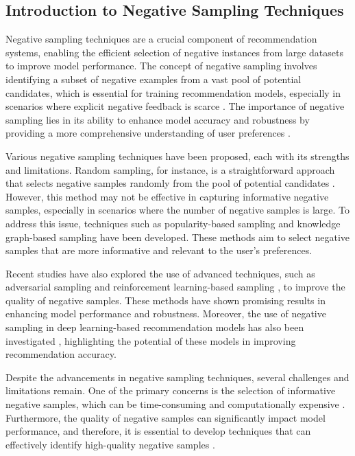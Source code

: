 \documentclass[11pt,a4paper]{article}
\begin{document}
\subsection{Introduction to Negative Sampling Techniques}


Negative sampling techniques are a crucial component of recommendation systems, enabling the efficient selection of negative instances from large datasets to improve model performance. The concept of negative sampling involves identifying a subset of negative examples from a vast pool of potential candidates, which is essential for training recommendation models, especially in scenarios where explicit negative feedback is scarce \cite{arxiv:math/0209281}. The importance of negative sampling lies in its ability to enhance model accuracy and robustness by providing a more comprehensive understanding of user preferences \cite{doi:10.1137/1.9781611972818.33}.

Various negative sampling techniques have been proposed, each with its strengths and limitations. Random sampling, for instance, is a straightforward approach that selects negative samples randomly from the pool of potential candidates \cite{doi:10.1145/3097983.3098202}. However, this method may not be effective in capturing informative negative samples, especially in scenarios where the number of negative samples is large. To address this issue, techniques such as popularity-based sampling \cite{arxiv:1802.05382} and knowledge graph-based sampling \cite{arxiv:1708.06816} have been developed. These methods aim to select negative samples that are more informative and relevant to the user's preferences.

Recent studies have also explored the use of advanced techniques, such as adversarial sampling \cite{arxiv:2010.04592} and reinforcement learning-based sampling \cite{arxiv:1810.07076}, to improve the quality of negative samples. These methods have shown promising results in enhancing model performance and robustness. Moreover, the use of negative sampling in deep learning-based recommendation models has also been investigated \cite{doi:10.1145/3366423.3380303}, highlighting the potential of these models in improving recommendation accuracy.

Despite the advancements in negative sampling techniques, several challenges and limitations remain. One of the primary concerns is the selection of informative negative samples, which can be time-consuming and computationally expensive \cite{doi:10.1145/3366423.3380303}. Furthermore, the quality of negative samples can significantly impact model performance, and therefore, it is essential to develop techniques that can effectively identify high-quality negative samples \cite{doi:10.1007/s10994-023-06468-w}.
\end{document}
